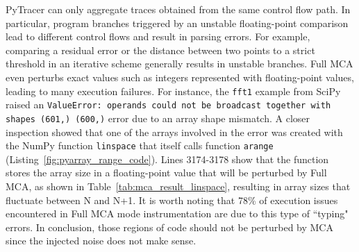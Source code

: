 \documentclass[11pt]{article}
\newcommand{\tristan}[1]{\color{orange}\textbf{From Tristan:} #1\color{black}\xspace}
\newcommand{\Yohan}[1]{\color{green!75!black}\textbf{Yohan:} #1\color{black}\xspace}
\newcommand{\pytracer}[0]{PyTracer\xspace}
\begin{document}
\pytracer can only aggregate traces obtained from the same control flow path. In particular, program branches triggered by an unstable floating-point comparison lead to different control flows and result in parsing errors. 
For example, comparing a residual error or the distance between two points to a strict threshold in an iterative scheme generally results in unstable branches. 
Full MCA even perturbs exact values such as integers represented with floating-point values, leading to many execution failures. For instance, the \texttt{fft1} example from SciPy raised an \texttt{ValueError: operands could not be broadcast together with shapes (601,) (600,)} error due to an array shape mismatch. A closer inspection showed that one of the arrays involved in the error was created with the NumPy function \texttt{linspace} that itself calls function \texttt{arange} (Listing~\ref{fig:pyarray_range_code}). 
Lines 3174-3178 show that the function stores the array size in a floating-point value that will be perturbed by Full MCA, as shown in Table~\ref{tab:mca_result_linspace}, resulting in array sizes that fluctuate between N and N+1.
It is worth noting that 78\% of execution issues encountered in Full MCA mode instrumentation
are due to this type of ``typing" errors.  
In conclusion, those regions of code should not be perturbed by MCA since the injected noise does not make sense.

\end{document}
